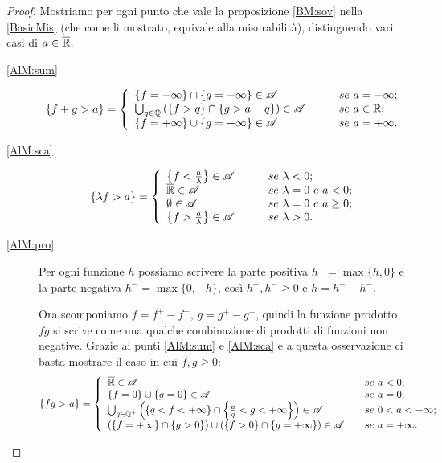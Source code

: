 \begin{proof}
	Mostriamo per ogni punto che vale la proposizione \ref{BM:sov} nella \cref{BasicMis} (che come lì mostrato, equivale alla misurabilità),
	distinguendo vari casi di $a\in \overline{\mathbb R}$.
	\begin{description}
	\item[\ref{AlM:sum}]
	\[
		\{f+g>a\}=\left\{\begin{array}{ll}
			\{f=-\infty\}\cap\{g=-\infty\}\in \A &\qquad se\ a=-\infty;\\
			\bigcup_{q\in \Q}\left(\{f>q\}\cap\{g>a-q\}\right)\in \A &\qquad se\ a\in \R;\\
			\{f=+\infty\}\cup\{g=+\infty\}\in \A &\qquad se\ a=+\infty.
		\end{array}\right.
	\]
	\item[\ref{AlM:sca}]
	\[
		\{\lambda f>a\}=\left\{\begin{array}{ll}
			\left\{f<\frac{a}{\lambda}\right\}\in \A &\qquad se\ \lambda<0;\\
			\Rbar \in \A &\qquad se\ \lambda=0\ e\ a< 0;\\
			\emptyset \in \A &\qquad se\ \lambda=0\ e\ a\geq 0;\\
			\left\{f>\frac{a}{\lambda}\right\}\in \A &\qquad se\ \lambda>0.
		\end{array}\right.
	\]
	\item[\ref{AlM:pro}] Per ogni funzione $h$ possiamo scrivere la parte positiva $h^+ = \max\{h,0\}$ e la parte negativa $h^- = \max\{0,-h\}$,
	così $h^+,h^- \geq 0$ e $h = h^+ - h^-$. 
	
	Ora scomponiamo $f=f^+ - f^-$, $g=g^+- g^-$, quindi la funzione prodotto $fg$ si scrive come una qualche combinazione di prodotti di funzioni non negative. Grazie ai punti \ref{AlM:sum} e \ref{AlM:sca} e a questa osservazione ci basta mostrare il caso in cui $f,g\geq0$:
	\[
		\{fg>a\}=\left\{\begin{array}{ll}
			\overline{\mathbb R}\in \mathscr A &\quad se\ a<0;\\
			\{f=0\}\cup\{g=0\}\in \mathscr A &\quad se\ a=0;\\
			\bigcup_{q\in \mathbb Q^+}\left(\{q<f<+\infty\}\cap\left\{\frac{a}{q}<g<+\infty \right\} \right)\in \mathscr A &\quad se\ 0<a<+\infty;\\
			(\{f=+\infty\}\cap\{g>0\})\cup (\{f>0\}\cap\{g=+\infty\})\in \mathscr A &\quad se\ a=+\infty.
		\end{array}\right.
	\]
	\end{description}
\end{proof}

